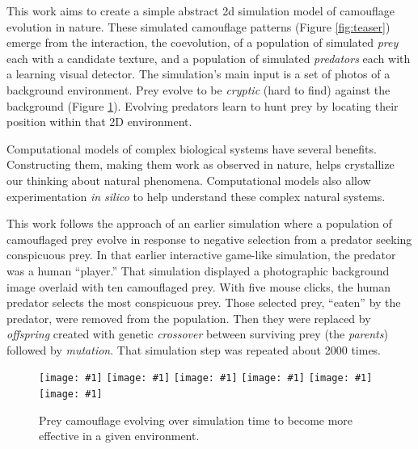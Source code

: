 \documentclass[letterpaper]{article}
\newcommand{\jargon}[1]{\textit{#1}}
\newcommand{\igsix}[1]{\texttt{[image: \#1]}}
\begin{document}
This work aims to create a simple abstract 2d simulation model of camouflage evolution in nature. These simulated camouflage patterns (Figure \ref{fig:teaser}) emerge from the interaction, the coevolution, of a population of simulated \jargon{prey} each with a candidate texture, and a population of simulated \jargon{predators} each with a learning visual detector. The simulation's main input is a set of photos of a background environment. Prey evolve to be \jargon{cryptic} (hard to find) against the background (Figure \ref{fig:time_sequence}). Evolving predators learn to hunt prey by locating their position within that 2D environment.
\par
Computational models of complex biological systems have several benefits. Constructing them, making them work as observed in nature, helps crystallize our thinking about natural phenomena. Computational models also allow experimentation \textit{in silico} to help understand these complex natural systems.
\par
This work follows the approach of an earlier simulation \citep{reynolds_iec_2011} where a population of camouflaged prey evolve in response to negative selection from a predator seeking conspicuous prey. In that earlier interactive game-like simulation, the predator was a human “player.” That simulation displayed a photographic background image overlaid with ten camouflaged prey. With five mouse clicks, the human predator selects the most conspicuous prey. Those selected prey, “eaten” by the predator, were removed from the population. Then they were replaced by \jargon{offspring} created with genetic \jargon{crossover} between surviving prey (the \jargon{parents}) followed by \jargon{mutation}. That simulation step was repeated about 2000 times.
\par



\begin{figure}[t]
    \igsix{20221030_1220_step_19.png}
    \hfill
    \igsix{20221030_1220_step_1045.png}
    \hfill
    \igsix{20221030_1220_step_2014.png}
    \hfill
    \igsix{20221030_1220_step_3059.png}
    \hfill
    \igsix{20221030_1220_step_6650.png}
    \hfill
    \igsix{20221030_1220_step_7467.png}
    \caption{Prey camouflage evolving over simulation time to become more effective in a given environment.}
    \label{fig:time_sequence}
\end{figure}
\end{document}
